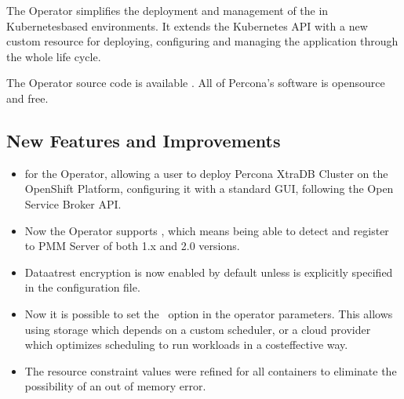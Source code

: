 \documentclass[letterpaper,10pt,english]{sphinxmanual}
\begin{document}
The Operator simplifies the deployment and management of the 
in Kubernetes\sphinxhyphen{}based environments. It extends the Kubernetes API with a new
custom resource for deploying, configuring and managing the application through
the whole life cycle.

The Operator source code is available .
All of Percona’s software is open\sphinxhyphen{}source and free.


\subsection{New Features and Improvements}
\label{\detokenize{RN/Kubernetes-Operator-for-PSMONGODB-RN1.2.0:new-features-and-improvements}}\begin{itemize}
\item {} 
for the Operator, allowing a user to deploy Percona XtraDB Cluster on the
OpenShift Platform, configuring it with a standard GUI, following the Open
Service Broker API.

\item {} 
Now the Operator supports ,
which means being able to detect and register to PMM Server of both 1.x and
2.0 versions.

\item {} 
Data\sphinxhyphen{}at\sphinxhyphen{}rest encryption is now enabled by default unless
 is explicitly specified in the 
configuration file.

\item {} 
Now it is possible to set the  option in the operator
parameters. This allows using storage which depends on a custom scheduler, or
a cloud provider which optimizes scheduling to run workloads in a
cost\sphinxhyphen{}effective way.

\item {} 
The resource constraint values were refined for all containers to eliminate
the possibility of an out of memory error.

\end{itemize}
\end{document}

